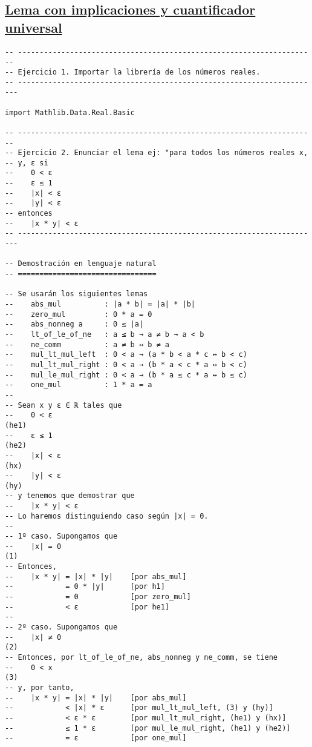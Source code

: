 \subsection{\href{./src/Logica/Lema\_con\_implicaciones\_y\_cuantificador\_universal.lean}{Lema con implicaciones y cuantificador universal}}
\label{sec:orga6aefd4}
\begin{verbatim}
-- ---------------------------------------------------------------------
-- Ejercicio 1. Importar la librería de los números reales.
-- ----------------------------------------------------------------------

import Mathlib.Data.Real.Basic

-- ---------------------------------------------------------------------
-- Ejercicio 2. Enunciar el lema ej: "para todos los números reales x,
-- y, ε si
--    0 < ε
--    ε ≤ 1
--    |x| < ε
--    |y| < ε
-- entonces
--    |x * y| < ε
-- ----------------------------------------------------------------------

-- Demostración en lenguaje natural
-- ================================

-- Se usarán los siguientes lemas
--    abs_mul          : |a * b| = |a| * |b|
--    zero_mul         : 0 * a = 0
--    abs_nonneg a     : 0 ≤ |a|
--    lt_of_le_of_ne   : a ≤ b → a ≠ b → a < b
--    ne_comm          : a ≠ b ↔ b ≠ a
--    mul_lt_mul_left  : 0 < a → (a * b < a * c ↔ b < c)
--    mul_lt_mul_right : 0 < a → (b * a < c * a ↔ b < c)
--    mul_le_mul_right : 0 < a → (b * a ≤ c * a ↔ b ≤ c)
--    one_mul          : 1 * a = a
--
-- Sean x y ε ∈ ℝ tales que
--    0 < ε                                                         (he1)
--    ε ≤ 1                                                         (he2)
--    |x| < ε                                                       (hx)
--    |y| < ε                                                       (hy)
-- y tenemos que demostrar que
--    |x * y| < ε
-- Lo haremos distinguiendo caso según |x| = 0.
--
-- 1º caso. Supongamos que
--    |x| = 0                                                        (1)
-- Entonces,
--    |x * y| = |x| * |y|    [por abs_mul]
--            = 0 * |y|      [por h1]
--            = 0            [por zero_mul]
--            < ε            [por he1]
--
-- 2º caso. Supongamos que
--    |x| ≠ 0                                                        (2)
-- Entonces, por lt_of_le_of_ne, abs_nonneg y ne_comm, se tiene
--    0 < x                                                          (3)
-- y, por tanto,
--    |x * y| = |x| * |y|    [por abs_mul]
--            < |x| * ε      [por mul_lt_mul_left, (3) y (hy)]
--            < ε * ε        [por mul_lt_mul_right, (he1) y (hx)]
--            ≤ 1 * ε        [por mul_le_mul_right, (he1) y (he2)]
--            = ε            [por one_mul]


\end{verbatim}
